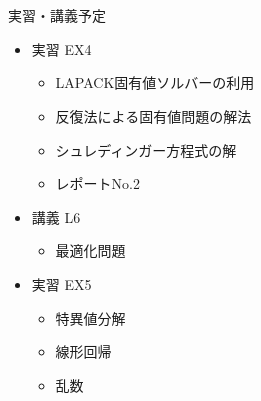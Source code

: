 \documentclass[dvipdfmx]{beamer}
\begin{document}
\section{}
\begin{frame}[t,fragile]{実習・講義予定}
  \begin{itemize}
    \setlength{\itemsep}{1em}
  \item 実習 EX4
    \begin{itemize}
    \item LAPACK固有値ソルバーの利用
    \item 反復法による固有値問題の解法
    \item シュレディンガー方程式の解
    \item レポートNo.2
    \end{itemize}
  \item 講義 L6
    \begin{itemize}
    \item 最適化問題
    \end{itemize}
  \item 実習 EX5
    \begin{itemize}
    \item 特異値分解
    \item 線形回帰
    \item 乱数
    \end{itemize}
  \end{itemize}
\end{frame}
\end{document}
